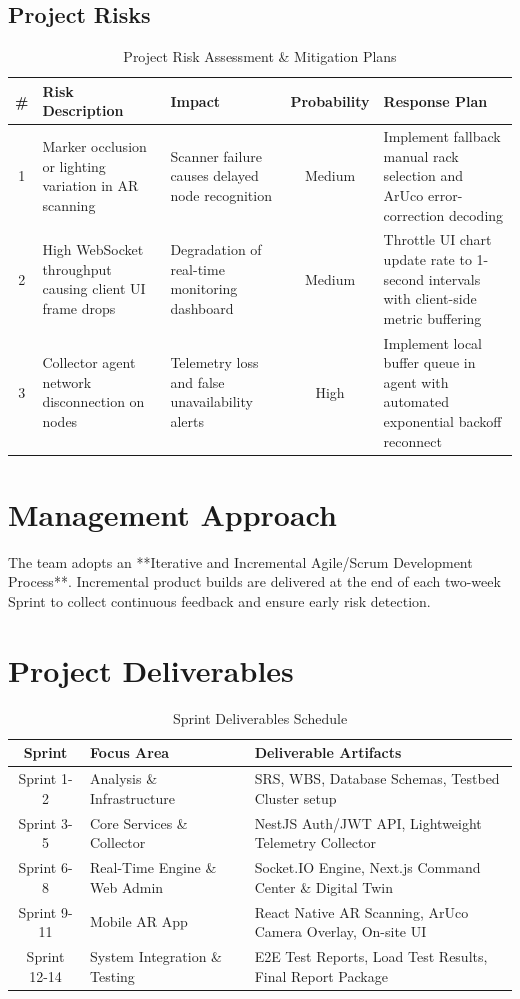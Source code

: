 \subsection{Project Risks}
\begin{table}[H]
    \centering
    \caption{Project Risk Assessment \& Mitigation Plans}
    \begin{tabular}{|c|p{4cm}|p{4cm}|c|p{4cm}|}
        \hline
        \textbf{\#} & \textbf{Risk Description} & \textbf{Impact} & \textbf{Probability} & \textbf{Response Plan} \\ \hline
        1 & Marker occlusion or lighting variation in AR scanning & Scanner failure causes delayed node recognition & Medium & Implement fallback manual rack selection and ArUco error-correction decoding \\ \hline
        2 & High WebSocket throughput causing client UI frame drops & Degradation of real-time monitoring dashboard & Medium & Throttle UI chart update rate to 1-second intervals with client-side metric buffering \\ \hline
        3 & Collector agent network disconnection on nodes & Telemetry loss and false unavailability alerts & High & Implement local buffer queue in agent with automated exponential backoff reconnect \\ \hline
    \end{tabular}
\end{table}

\section{Management Approach}
The team adopts an **Iterative and Incremental Agile/Scrum Development Process**. Incremental product builds are delivered at the end of each two-week Sprint to collect continuous feedback and ensure early risk detection.

\section{Project Deliverables}
\begin{table}[H]
    \centering
    \caption{Sprint Deliverables Schedule}
    \begin{tabular}{|c|l|l|}
        \hline
        \textbf{Sprint} & \textbf{Focus Area} & \textbf{Deliverable Artifacts} \\ \hline
        Sprint 1-2 & Analysis \& Infrastructure & SRS, WBS, Database Schemas, Testbed Cluster setup \\ \hline
        Sprint 3-5 & Core Services \& Collector & NestJS Auth/JWT API, Lightweight Telemetry Collector \\ \hline
        Sprint 6-8 & Real-Time Engine \& Web Admin & Socket.IO Engine, Next.js Command Center \& Digital Twin \\ \hline
        Sprint 9-11 & Mobile AR App & React Native AR Scanning, ArUco Camera Overlay, On-site UI \\ \hline
        Sprint 12-14 & System Integration \& Testing & E2E Test Reports, Load Test Results, Final Report Package \\ \hline
    \end{tabular}
\end{table}

